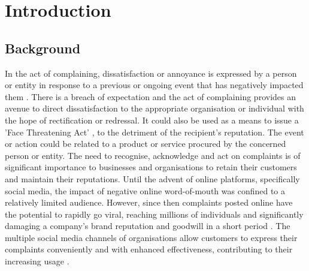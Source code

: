 \chapter{Introduction}

\section{Background}
In the act of complaining, dissatisfaction or annoyance is expressed by a person or entity in response to a previous or ongoing event that has negatively impacted them \cite{olshtain_speechact_1987}. There is a breach of expectation and the act of complaining provides an avenue to direct dissatisfaction to the appropriate organisation or individual with the hope of rectification or redressal. It could also be used as a means to issue a 'Face Threatening Act' \cite{brownPolitenessUniversalsLanguage1987}, to the detriment of the recipient's reputation. The event or action could be related to a product or service procured by the concerned person or entity. The need to recognise, acknowledge and act on complaints is of significant importance to businesses and organisations to retain their customers and maintain their reputations.
\newline \newline
Until the advent of online platforms, specifically social media, the impact of negative online word-of-mouth was confined to a relatively limited audience. However, since then complaints posted online have the potential to rapidly go viral, reaching millions of individuals and significantly damaging a company's brand reputation and goodwill in a short period \cite{tripp_when_2011}. The multiple social media channels of organisations allow customers to express their complaints conveniently and with enhanced effectiveness, contributing to their increasing usage \cite{balaji_customer_2015}.\newline


